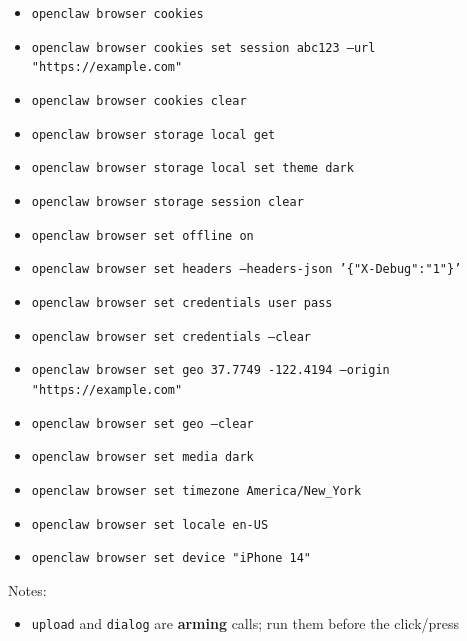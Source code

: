 \begin{itemize}
  \item \texttt{openclaw browser cookies}
  \item \texttt{openclaw browser cookies set session abc123 --url "https://example.com"}
  \item \texttt{openclaw browser cookies clear}
  \item \texttt{openclaw browser storage local get}
  \item \texttt{openclaw browser storage local set theme dark}
  \item \texttt{openclaw browser storage session clear}
  \item \texttt{openclaw browser set offline on}
  \item \texttt{openclaw browser set headers --headers-json '\{"X-Debug":"1"\}'}
  \item \texttt{openclaw browser set credentials user pass}
  \item \texttt{openclaw browser set credentials --clear}
  \item \texttt{openclaw browser set geo 37.7749 -122.4194 --origin "https://example.com"}
  \item \texttt{openclaw browser set geo --clear}
  \item \texttt{openclaw browser set media dark}
  \item \texttt{openclaw browser set timezone America/New\_York}
  \item \texttt{openclaw browser set locale en-US}
  \item \texttt{openclaw browser set device "iPhone 14"}
\end{itemize}


Notes:

\begin{itemize}
  \item \texttt{upload} and \texttt{dialog} are \textbf{arming} calls; run them before the click/press
\end{itemize}

